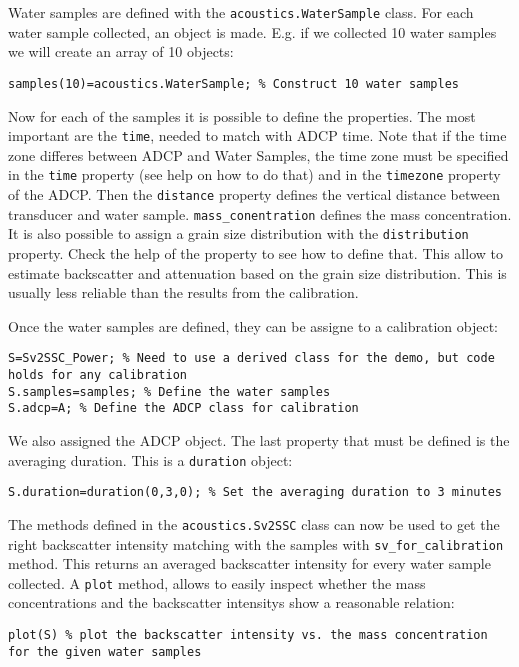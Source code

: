 \documentclass[]{article}
\begin{document}
Water samples are defined with the \lstinline!acoustics.WaterSample! class. For each water sample collected, an object is made. E.g. if we collected 10 water samples we will create an array of 10 objects:
\begin{lstlisting}
samples(10)=acoustics.WaterSample; % Construct 10 water samples
\end{lstlisting}
Now for each of the samples it is possible to define the properties. The most important are the \lstinline!time!, needed to match with ADCP time. Note that if the time zone differes between ADCP and Water Samples, the time zone must be specified in the \lstinline!time! property (see help on how to do that) and in the \lstinline!timezone! property of the ADCP. Then the \lstinline!distance! property defines the vertical distance between transducer and water sample. \lstinline!mass_conentration! defines the mass concentration. It is also possible to assign a grain size distribution with the \lstinline!distribution! property. Check the help of the property to see how to define that. This allow to estimate backscatter and attenuation based on the grain size distribution. This is usually less reliable than the results from the calibration. 

Once the water samples are defined, they can be assigne to a calibration object:
\begin{lstlisting}
S=Sv2SSC_Power; % Need to use a derived class for the demo, but code holds for any calibration
S.samples=samples; % Define the water samples
S.adcp=A; % Define the ADCP class for calibration
\end{lstlisting}
We also assigned the ADCP object. The last property that must be defined is the averaging duration. This is a \lstinline!duration! object:
\begin{lstlisting}
S.duration=duration(0,3,0); % Set the averaging duration to 3 minutes
\end{lstlisting}
The methods defined in the \lstinline!acoustics.Sv2SSC! class can now be used to get the right backscatter intensity matching with the samples with \lstinline!sv_for_calibration! method. This returns an averaged backscatter intensity for every water sample collected. A \lstinline!plot! method, allows to easily inspect whether the mass concentrations and the backscatter intensitys show a reasonable relation:
\begin{lstlisting}
plot(S) % plot the backscatter intensity vs. the mass concentration for the given water samples
\end{lstlisting}
\end{document}

